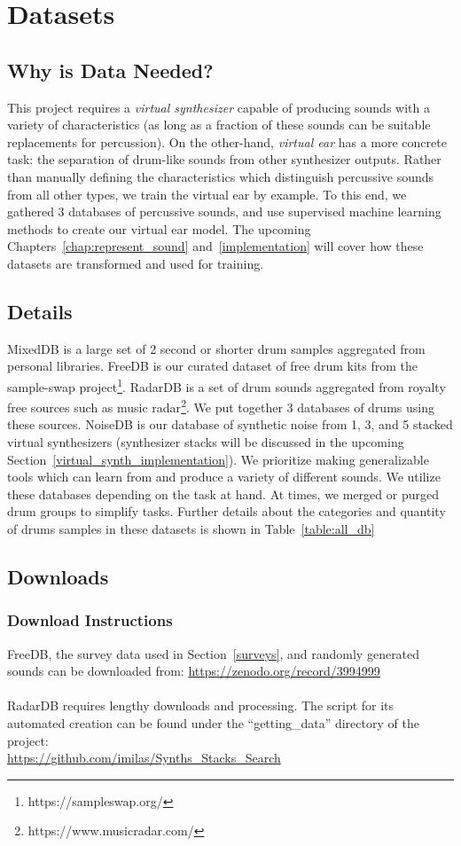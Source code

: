 \documentclass[\main/thesis.tex]{subfiles}
\begin{document}
\chapter{Datasets}
\label{sec:datasets}
\section{Why is Data Needed?}
This project requires a \textit{virtual synthesizer} capable of producing sounds with a variety of characteristics (as long as a fraction of these sounds can be suitable replacements for percussion). On the other-hand, \textit{virtual ear} has a more concrete task: the separation of drum-like sounds from other synthesizer outputs. Rather than manually defining the characteristics which distinguish percussive sounds from all other types, we train the virtual ear by example. To this end, we gathered 3 databases of percussive sounds, and use supervised machine learning methods to create our virtual ear model. The upcoming Chapters~\ref{chap:represent_sound} and~\ref{implementation} will cover how these datasets are transformed and used for training.


\section{Details}
MixedDB is a large set of 2 second or shorter drum samples aggregated from personal libraries. FreeDB is our curated dataset of free drum kits from the sample-swap project\footnote{https://sampleswap.org/}. RadarDB is a set of drum sounds aggregated from royalty free sources such as music radar\footnote{https://www.musicradar.com/}. We put together 3 databases of drums using these sources. NoiseDB is our database of synthetic noise from 1, 3, and 5 stacked virtual synthesizers (synthesizer stacks will be discussed in the upcoming Section~\ref{virtual_synth_implementation}). We prioritize making generalizable tools which can learn from and produce a variety of different sounds. We utilize these databases depending on the task at hand. At times, we merged or purged drum groups to simplify tasks. Further details about the categories and quantity of drums samples in these datasets is shown in Table~\ref{table:all_db}


\section{Downloads}
\label{appendix:datasets}
\subsection{Download Instructions}
FreeDB, the survey data used in Section~\ref{surveys}, and randomly generated sounds can be downloaded from: \url{https://zenodo.org/record/3994999}\\\\
RadarDB requires lengthy downloads and processing. The script for its automated creation can be found under the \enquote{getting\_data} directory of the project:\\
\url{https://github.com/imilas/Synths_Stacks_Search} 
\end{document}
